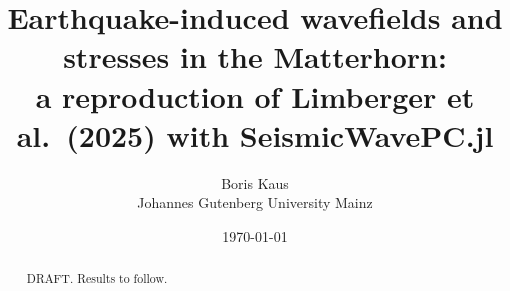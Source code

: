 \documentclass[11pt,a4paper]{article}
\title{Earthquake-induced wavefields and stresses in the Matterhorn:\\
a reproduction of Limberger et al.\ (2025) with SeismicWavePC.jl}
\author{Boris Kaus\\ {\small Johannes Gutenberg University Mainz}}
\date{\today}
\begin{document}
\maketitle

\begin{abstract}
DRAFT. Results to follow.
\end{abstract}


\end{document}
